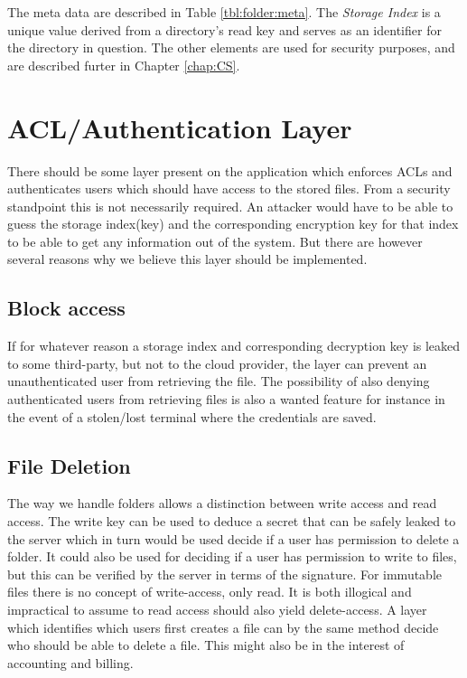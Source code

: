 \documentclass[pdftex,english,10pt,b5paper,twoside]{book}
\begin{document}
The meta data are described in Table \ref{tbl:folder:meta}. The \emph{Storage
Index} is a unique value derived from a directory's read key and serves as an
identifier for the directory in question. The other elements are used for
security purposes, and are described furter in Chapter \ref{chap:CS}.



\section{ACL/Authentication Layer}
There should be some layer present on the application which enforces \ac{ACL}s and
authenticates users which should have access to the stored files. From a security
standpoint this is not necessarily required. An attacker would have to be able
to guess the storage index(key) and the corresponding encryption key for that
index to be able to get any information out of the system. But there are however
several reasons why we believe this layer should be implemented.

\subsection{Block access}
If for whatever reason a storage index and corresponding decryption key is
leaked to some third-party, but not to the cloud provider, the layer can
prevent an unauthenticated user from retrieving the file. The possibility of
also denying authenticated users from retrieving files is also a wanted feature
for instance in the event of a stolen/lost terminal where the credentials are
saved.

\subsection{File Deletion}
The way we handle folders allows a distinction between write access and read
access. The write key can be used to deduce a secret that can be safely leaked
to the server which in turn would be used decide if a user has permission to
delete a folder. It could also be used for deciding if a user has permission to
write to files, but this can be verified by the server in terms of the
signature.
For immutable files there is no concept of write-access, only read. It is
both illogical and impractical to assume to read access should also yield
delete-access. A layer which identifies which users first creates a file can
by the same method decide who should be able to delete a file. This might also
be in the interest of accounting and billing.
\end{document}
